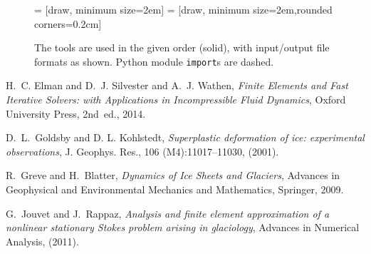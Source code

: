 \documentclass[letterpaper,final,12pt,reqno]{amsart}
\begin{document}
\begin{figure}[h]
\bigskip
{} = [draw, minimum size=2em]
 = [draw, minimum size=2em,rounded corners=0.2cm]
\label{blockdiagram}

\medskip
\caption{The tools are used in the given order (solid), with input/output file formats as shown.  Python module \texttt{import}s are dashed.}
\end{figure}


\small

\bigskip

\begin{thebibliography}{4}

{\sc H.~C. Elman and D.~J. Silvester and A.~J. Wathen}, {\em Finite Elements
  and Fast Iterative Solvers: with Applications in Incompressible Fluid Dynamics},
  Oxford University Press, 2nd~ed., 2014.

{\sc D.~L.~Goldsby and D. L. Kohlstedt}, {\em Superplastic deformation of ice:
  experimental observations}, J. Geophys. Res., 106 (M4):11017--11030, (2001).

{\sc R.~Greve and H.~Blatter}, {\em Dynamics of {I}ce {S}heets and {G}laciers},
  Advances in Geophysical and Environmental Mechanics and Mathematics,
  Springer, 2009.

{\sc G.~Jouvet and J.~Rappaz}, {\em Analysis and finite element approximation
  of a nonlinear stationary {S}tokes problem arising in glaciology}, Advances
  in Numerical Analysis, (2011).

\end{thebibliography}
\end{document}
